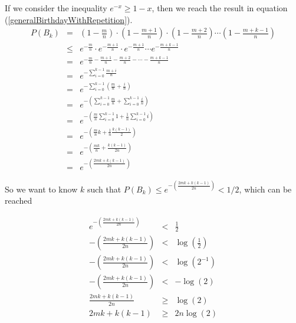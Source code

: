 \documentclass[tikz, 12pt]{scrartcl}
\begin{document}
\begin{enumerate}
	If we consider the inequality $e^{-x} \geq 1-x$, then we reach the result in equation (\ref{generalBirthdayWithRepetition}).
	\begin{eqnarray}
	P(B_k)	&	=	&	\left(1 - \frac{m}{n} \right) \cdot \left(1 -  \frac{m + 1}{n} \right)\cdot \left(1 -  \frac{m + 2}{n} \right) \cdots \left(1 -  \frac{m + k-1}{n} \right) \nonumber \\
			&	\leq	&	e^{-\frac{m}{n}} \cdot e^{-\frac{m+1}{n}}\cdot e^{-\frac{m+1}{n}} \cdots e^{-\frac{m+k - 1}{n}} \nonumber \\
			&	=	&	e^{-\frac{m}{n}-\frac{m + 1}{n} -\frac{m + 2}{n} - \cdots -\frac{m + k -1}{n}} \nonumber\\
			&	=	&	e^{-\sum_{i=0}^{k - 1}\frac{m + i}{n} }\nonumber \\
			&	=	&	e^{-\sum_{i=0}^{k - 1}\left( \frac{m}{n}  + \frac{i}{n} \right)}  \nonumber \\
			&	=	&	e^{-\left( \sum_{i=0}^{k - 1} \frac{m}{n}  + \sum_{i=0}^{k - 1} \frac{i}{n} \right)}  \nonumber \\
			&	=	&	e^{-\left( \frac{m}{n} \sum_{i=0}^{k - 1} 1 + \frac{1}{n}\sum_{i=0}^{k - 1} i \right)}  \nonumber \\			
			&	=	&	e^{-\left( \frac{m}{n} k+ \frac{1}{n}\frac{k(k -1)}{2} \right)}  \nonumber \\	
			&	=	&	e^{-\left( \frac{mk}{n}+ \frac{k(k -1)}{2n}\right)}  \nonumber \\	
			&	=	&	e^{-\left(\frac{2mk + k(k - 1)}{2n} \right)}  \label{generalBirthdayWithRepetition}			
	\end{eqnarray}
	
	So we want to know $k$ such that $P(B_k) \leq e^{-\left(\frac{2mk + k(k - 1)}{2n} \right)} < 1/2$, which can be reached 
	
	\begin{eqnarray}
	e^{-\left(\frac{2mk + k(k - 1)}{2n} \right)} 	&	<	&	\frac{1}{2} \nonumber \\
	-\left(\frac{2mk + k(k - 1)}{2n} \right)		&	<	&	\log\left( \frac{1}{2} \right) \nonumber \\
	-\left(\frac{2mk + k(k - 1)}{2n} \right)		&	<	&	\log ( 2^{-1} ) \nonumber \\
	-\left(\frac{2mk + k(k - 1)}{2n} \right)		&	<	&	-\log( 2) \nonumber \\
	\frac{2mk + k(k - 1)}{2n} 				&	\geq	&	\log( 2) \nonumber \\
	2mk + k(k - 1)						&	\geq	&	2n \log(2) \nonumber\\
	\end{eqnarray}
	

\end{enumerate}
\end{document}
